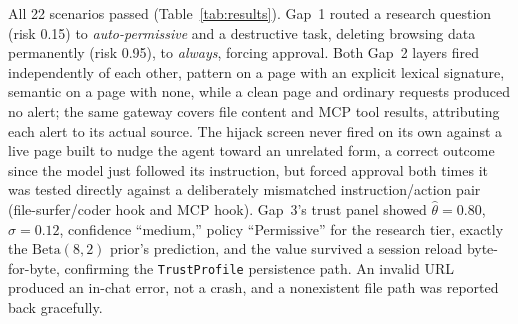 \documentclass[a4paper, 11pt]{article}
\begin{document}
All 22 scenarios passed (Table~\ref{tab:results}). Gap~1 routed a research
question (risk 0.15) to \textit{auto-permissive} and a destructive task, deleting
browsing data permanently (risk 0.95), to \textit{always}, forcing approval. Both
Gap~2 layers fired independently of each other, pattern on a page with an
explicit lexical signature, semantic on a page with none, while a clean page and
ordinary requests produced no alert; the same gateway covers file content and MCP
tool results, attributing each alert to its actual source. The hijack screen
never fired on its own against a live page built to nudge the agent toward an
unrelated form, a correct outcome since the model just followed its instruction,
but forced approval both times it was tested directly against a deliberately
mismatched instruction/action pair (file-surfer/coder hook and MCP hook). Gap~3's
trust panel showed $\hat\theta=0.80$, $\sigma=0.12$, confidence ``medium,''
policy ``Permissive'' for the research tier, exactly the $\mathrm{Beta}(8,2)$
prior's prediction, and the value survived a session reload byte-for-byte,
confirming the \texttt{TrustProfile} persistence path. An invalid URL produced an
in-chat error, not a crash, and a nonexistent file path was reported back
gracefully.
\end{document}
